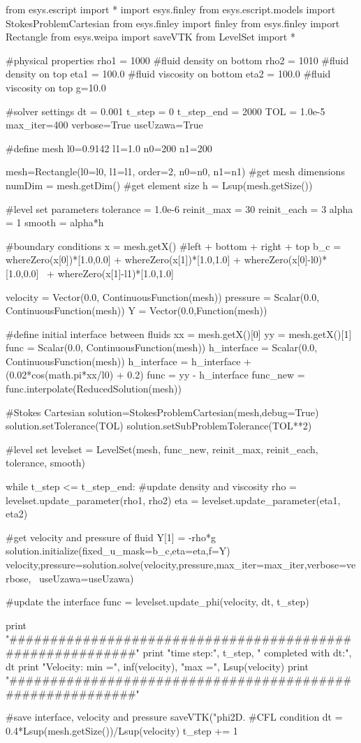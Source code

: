 \begin{python}

from esys.escript import *
import esys.finley
from esys.escript.models import StokesProblemCartesian
from esys.finley import finley
from esys.finley import Rectangle
from esys.weipa import saveVTK
from LevelSet import *

#physical properties
rho1 = 1000		#fluid density on bottom
rho2 = 1010		#fluid density on top
eta1 = 100.0		#fluid viscosity on bottom
eta2 = 100.0		#fluid viscosity on top
g=10.0

#solver settings
dt = 0.001
t_step = 0
t_step_end = 2000
TOL = 1.0e-5
max_iter=400
verbose=True
useUzawa=True

#define mesh
l0=0.9142
l1=1.0
n0=200      
n1=200

mesh=Rectangle(l0=l0, l1=l1, order=2, n0=n0, n1=n1)
#get mesh dimensions
numDim = mesh.getDim()
#get element size
h = Lsup(mesh.getSize())

#level set parameters
tolerance = 1.0e-6
reinit_max = 30
reinit_each = 3
alpha = 1
smooth = alpha*h 

#boundary conditions
x = mesh.getX()
#left + bottom + right + top
b_c = whereZero(x[0])*[1.0,0.0] + whereZero(x[1])*[1.0,1.0] + whereZero(x[0]-l0)*[1.0,0.0] \
      + whereZero(x[1]-l1)*[1.0,1.0]

velocity = Vector(0.0, ContinuousFunction(mesh))
pressure = Scalar(0.0, ContinuousFunction(mesh))
Y = Vector(0.0,Function(mesh))

#define initial interface between fluids
xx = mesh.getX()[0]
yy = mesh.getX()[1]
func = Scalar(0.0, ContinuousFunction(mesh))
h_interface = Scalar(0.0, ContinuousFunction(mesh))
h_interface = h_interface + (0.02*cos(math.pi*xx/l0) + 0.2)
func = yy - h_interface
func_new = func.interpolate(ReducedSolution(mesh))

#Stokes Cartesian
solution=StokesProblemCartesian(mesh,debug=True)
solution.setTolerance(TOL)
solution.setSubProblemTolerance(TOL**2)

#level set
levelset = LevelSet(mesh, func_new, reinit_max, reinit_each, tolerance, smooth)    

while t_step <= t_step_end:
  #update density and viscosity
  rho = levelset.update_parameter(rho1, rho2)
  eta = levelset.update_parameter(eta1, eta2)

  #get velocity and pressure of fluid
  Y[1] = -rho*g
  solution.initialize(fixed_u_mask=b_c,eta=eta,f=Y)
  velocity,pressure=solution.solve(velocity,pressure,max_iter=max_iter,verbose=verbose, \ 
  useUzawa=useUzawa)
  
  #update the interface
  func = levelset.update_phi(velocity, dt, t_step)  

  print "##########################################################"
  print "time step:", t_step, " completed with dt:", dt
  print "Velocity: min =", inf(velocity), "max =", Lsup(velocity)
  print "##########################################################"
 
  #save interface, velocity and pressure 
  saveVTK("phi2D.%
  #CFL condition
  dt = 0.4*Lsup(mesh.getSize())/Lsup(velocity)
  t_step += 1

\end{python}
